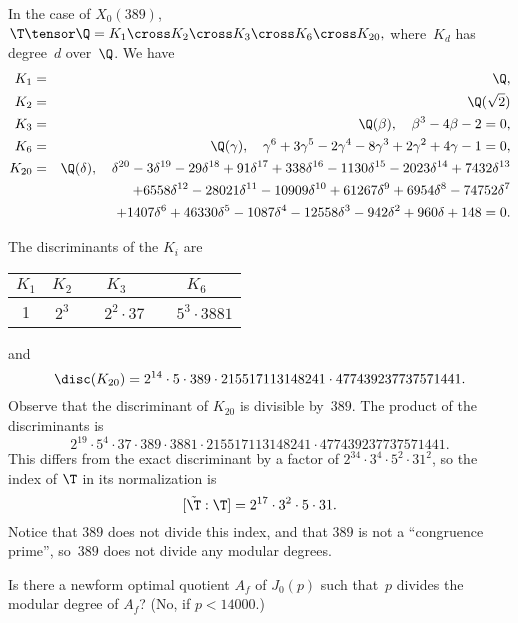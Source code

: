 \documentclass{report}
\begin{document}
In the case of $X_0(389)$,
$\T\tensor \Q = K_1\cross K_2\cross K_3\cross K_6\cross K_{20},$
where~$K_d$ has degree~$d$ over~$\Q$.
We have
\begin{eqnarray*}
K_1&=&\Q, \\
K_2&=&\Q(\sqrt{2})\\
K_3&=&\Q(\beta) , \quad \beta^3-4\beta-2=0,\\
K_6&=&\Q(\gamma),
      \quad \gamma^6+3\gamma^5-2\gamma^4-8\gamma^3+2\gamma^2+4\gamma-1=0,\\
K_{20}&=&\Q(\delta), \quad \delta^{20}-3\delta^{19}-29\delta^{18}+91\delta^{17}+338\delta^{16}-1130\delta^{15}-2023\delta^{14}+7432\delta^{13}\\
    &&\qquad +6558\delta^{12}-28021\delta^{11}-10909\delta^{10}+61267\delta^9 +6954\delta^8-74752\delta^7\\
    &&\qquad +1407\delta^6+46330\delta^5
-1087\delta^4-12558\delta^3-942\delta^2+960\delta+148=0.
\end{eqnarray*}


The discriminants of the $K_i$ are
\begin{center}
\begin{tabular}{|c|c|c|c|}\hline
    $K_1$ & $K_2$ & $K_3$ & $K_6$ \\\hline
 1 & $2^3$  & $\quad 2^2\cdot 37$ & $\quad 5^3\cdot 3881$ \\\hline
\end{tabular}
\end{center}
and
$$
  \disc(K_{20}) =  2^{14}\cdot 5\cdot 389 \cdot 215517113148241\cdot 477439237737571441.
$$
Observe that the discriminant of $K_{20}$ is divisible by~$389$.
The product of the discriminants is
$$2^{19}\cdot 5^4\cdot 37\cdot 389\cdot 3881\cdot 215517113148241\cdot
    477439237737571441.$$
This differs from the exact discriminant by a factor
of $2^{34}\cdot 3^4\cdot 5^2\cdot 31^2$, so
the index of $\T$ in its normalization is
$$[\tilde{\T}:\T]=2^{17}\cdot 3^2\cdot 5\cdot 31.$$
Notice that $389$ does not divide this index, and that $389$ is not
a ``congruence prime'', so~$389$ does not divide any
modular degrees.

\begin{question}
Is there a newform optimal quotient $A_f$ of $J_0(p)$
such that~$p$ divides the modular degree of $A_f$?
(No, if $p<14000$.)
\end{question}
\end{document}
